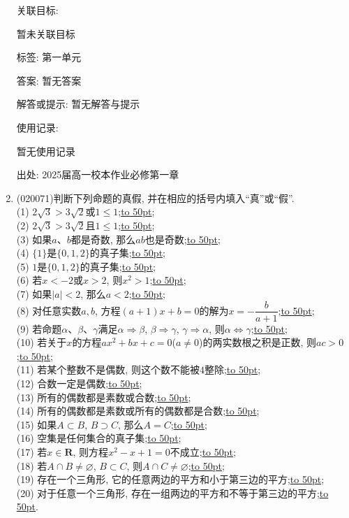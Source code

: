 \documentclass[10pt,a4paper]{article}
\newcommand{\blank}[1]{\underline{\hbox to #1pt{}}}
\begin{document}
\begin{enumerate}[1.]
关联目标:

暂未关联目标



标签: 第一单元

答案: 暂无答案

解答或提示: 暂无解答与提示

使用记录:

暂无使用记录


出处: 2025届高一校本作业必修第一章
\item { (020071)}判断下列命题的真假, 并在相应的括号内填入``真''或``假''.\\
(1) $2\sqrt 3>3\sqrt 2$或$1\le 1$;\blank{50};\\
(2) $2\sqrt 3>3\sqrt 2$且$1\le1$;\blank{50};\\
(3) 如果$a$、$b$都是奇数, 那么$ab$也是奇数;\blank{50};\\
(4) $\{1\}$是$\{0, 1, 2\}$的真子集;\blank{50};\\
(5) $1$是$\{0, 1, 2\}$的真子集;\blank{50};\\
(6) 若$x<-2$或$x>2$, 则$x^2>1$;\blank{50};\\
(7) 如果$|a|<2$, 那么$a<2$;\blank{50};\\
(8) 对任意实数$a,b$, 方程$(a+1)x+b=0$的解为$x=-\dfrac b{a+1}$;\blank{50};\\
(9) 若命题$\alpha$、$\beta$、$\gamma$满足$\alpha\Rightarrow \beta$, $\beta\Rightarrow \gamma$, $\gamma\Rightarrow \alpha$, 则$\alpha\Leftrightarrow \gamma$;\blank{50};\\
(10) 若关于$x$的方程$ax^2+bx+c=0$($a\ne 0$)的两实数根之积是正数, 则$ac>0$;\blank{50};\\
(11) 若某个整数不是偶数, 则这个数不能被$4$整除;\blank{50};\\
(12) 合数一定是偶数;\blank{50};\\
(13) 所有的偶数都是素数或合数;\blank{50};\\
(14) 所有的偶数都是素数或所有的偶数都是合数;\blank{50};\\
(15) 如果$A\subset B$, $B\supset C$, 那么$A=C$;\blank{50};\\
(16) 空集是任何集合的真子集;\blank{50};\\
(17) 若$x\in \mathbf{R}$, 则方程$x^2-x+1=0$不成立;\blank{50};\\
(18) 若$A\cap B\ne \varnothing$, $B\subset C$, 则$A\cap C\ne \varnothing$;\blank{50};\\
(19) 存在一个三角形, 它的任意两边的平方和小于第三边的平方;\blank{50};\\
(20) 对于任意一个三角形, 存在一组两边的平方和不等于第三边的平方;\blank{50}.



\end{enumerate}
\end{document}

